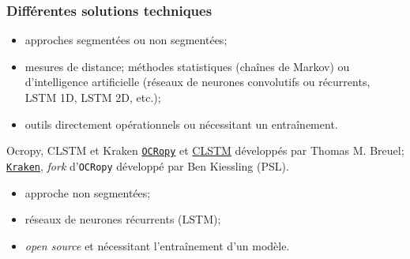 \documentclass[10pt, compress,urlcolor=blue]{beamer}
\begin{document}
\begin{frame}
		\frametitle{Différentes solutions techniques}
		
		
		\begin{itemize}
			\item approches segmentées ou non segmentées;
			\item mesures de distance; méthodes statistiques (chaînes de Markov) ou d'intelligence artificielle (réseaux de neurones convolutifs ou récurrents, LSTM 1D, LSTM 2D, etc.);
			\item outils directement opérationnels ou nécessitant un entraînement.
		\end{itemize}
		
		
		\begin{block}{Ocropy, CLSTM et Kraken}
			\href{https://github.com/tmbdev/ocropy}{\texttt{OCRopy}} et \href{http://github.com/tmbdev/clstm}{CLSTM} développés par Thomas M. Breuel; \href{https://github.com/mittagessen/kraken}{\texttt{Kraken}}, \textit{fork} d'\texttt{OCRopy} développé par Ben Kiessling (PSL).
			\begin{itemize}
				\item approche non segmentées;
				\item réseaux de neurones récurrents (LSTM);
				\item \textit{open source} et nécessitant l'entraînement d'un modèle.
			\end{itemize}
		\end{block}
		
	\end{frame}
	
\end{document}
